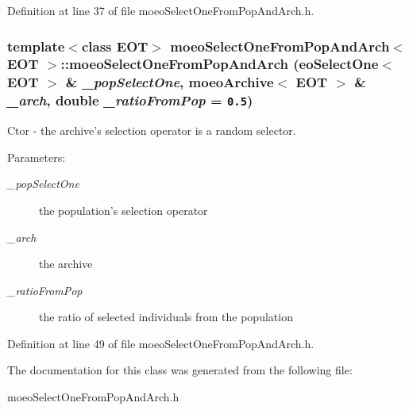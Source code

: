 Definition at line 37 of file moeo\-Select\-One\-From\-Pop\-And\-Arch.h.
\subsubsection{\setlength{\rightskip}{0pt plus 5cm}template$<$class EOT$>$ {\bf moeo\-Select\-One\-From\-Pop\-And\-Arch}$<$ EOT $>$::{\bf moeo\-Select\-One\-From\-Pop\-And\-Arch} (eo\-Select\-One$<$ EOT $>$ \& {\em \_\-pop\-Select\-One}, {\bf moeo\-Archive}$<$ EOT $>$ \& {\em \_\-arch}, double {\em \_\-ratio\-From\-Pop} = {\tt 0.5})\hspace{0.3cm}{\tt  [inline]}}\label{classmoeoSelectOneFromPopAndArch_1aeab159a74bf4cd171e2045e25be2b7}


Ctor - the archive's selection operator is a random selector. 

\begin{Desc}
\item[Parameters:]
\begin{description}
\item[{\em \_\-pop\-Select\-One}]the population's selection operator \item[{\em \_\-arch}]the archive \item[{\em \_\-ratio\-From\-Pop}]the ratio of selected individuals from the population \end{description}
\end{Desc}


Definition at line 49 of file moeo\-Select\-One\-From\-Pop\-And\-Arch.h.

The documentation for this class was generated from the following file:\begin{CompactItemize}
\item 
moeo\-Select\-One\-From\-Pop\-And\-Arch.h\end{CompactItemize}

